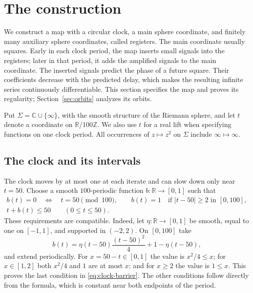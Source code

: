 \section{The construction}
\label{sec:construction}

We construct a map with a circular clock, a main sphere coordinate, and
finitely many auxiliary sphere coordinates, called registers.  The main
coordinate usually squares.  Early in each clock period, the map inserts
small signals into the registers; later in that period, it adds the
amplified signals to the main coordinate.  The inserted signals predict
the phase of a future square.  Their coefficients decrease with the
predicted delay, which makes the resulting infinite series continuously
differentiable.  This section specifies the map and proves its regularity;
Section~\ref{sec:orbits} analyzes its orbits.

Put $\Sigma=\mathbb C\cup\{\infty\}$, with the smooth structure of the
Riemann sphere, and let $t$ denote a coordinate on
$\mathbb R/100\mathbb Z$.  We also use $t$ for a real lift when specifying
functions on one clock period.  All occurrences of $z\mapsto z^2$ on
$\Sigma$ include $\infty\mapsto\infty$.

\subsection{The clock and its intervals}

The clock moves by at most one at each iterate and can slow down only
near $t=50$.  Choose a smooth $100$-periodic function
$b\colon\mathbb R\to[0,1]$ such that
\begin{equation}
\label{eq:clock-barrier}
\begin{gathered}
 b(t)=0\quad\Longleftrightarrow\quad t=50\pmod{100},
 \qquad b(t)=1\quad\text{if }|t-50|\ge2\text{ in }[0,100],\\
 t+b(t)\le50\qquad(0\le t\le50).
\end{gathered}
\end{equation}
These requirements are compatible.  Indeed, let
$\eta\colon\mathbb R\to[0,1]$ be smooth, equal to one on $[-1,1]$,
and supported in $(-2,2)$.  On $[0,100]$ take
\[
 b(t)=\eta(t-50)\frac{(t-50)^2}{4}+1-\eta(t-50),
\]
and extend periodically.  For $x=50-t\in[0,1]$ the value is $x^2/4\le x$;
for $x\in[1,2]$ both $x^2/4$ and $1$ are at most $x$; and for $x\ge2$
the value is $1\le x$.  This proves the last condition in
\eqref{eq:clock-barrier}.  The other conditions follow directly from the
formula, which is constant near both endpoints of the period.

